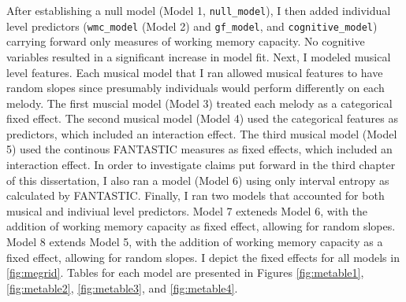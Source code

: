 \documentclass[12pt,]{book}
\begin{document}
After establishing a null model (Model 1, \texttt{null\_model}), I then added individual level predictors (\texttt{wmc\_model} (Model 2) and \texttt{gf\_model}, and \texttt{cognitive\_model}) carrying forward only measures of working memory capacity.
No cognitive variables resulted in a significant increase in model fit.
Next, I modeled musical level features.
Each musical model that I ran allowed musical features to have random slopes since presumably individuals would perform differently on each melody.
The first muscial model (Model 3) treated each melody as a categorical fixed effect.
The second musical model (Model 4) used the categorical features as predictors, which included an interaction effect.
The third musical model (Model 5) used the continous FANTASTIC measures as fixed effects, which included an interaction effect.
In order to investigate claims put forward in the third chapter of this dissertation, I also ran a model (Model 6) using only interval entropy as calculated by FANTASTIC.
Finally, I ran two models that accounted for both musical and indiviual level predictors.
Model 7 exteneds Model 6, with the addition of working memory capacity as fixed effect, allowing for random slopes.
Model 8 extends Model 5, with the addition of working memory capacity as a fixed effect, allowing for random slopes.
I depict the fixed effects for all models in \ref{fig:megrid}.
Tables for each model are presented in Figures \ref{fig:metable1}, \ref{fig:metable2}, \ref{fig:metable3}, and \ref{fig:metable4}.

\begin{table}[t]

\caption{\label{tab:modeltable}Linear Mixed Effects Model Fits}
\centering
{}
\end{table}
\end{document}

